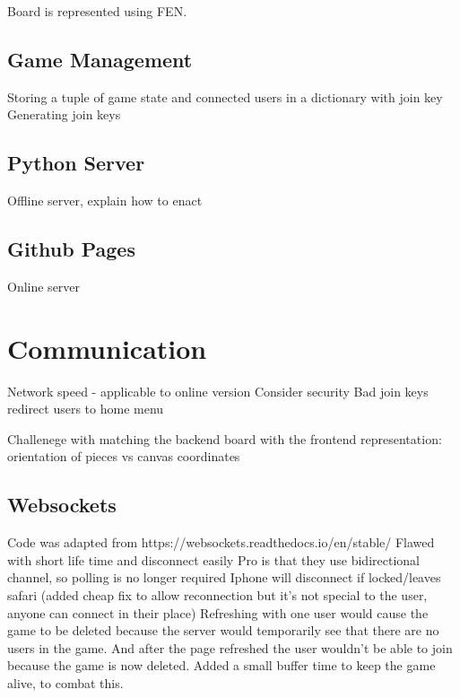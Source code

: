 Board is represented using FEN.

\subsection{Game Management}

Storing a tuple of game state and connected users in a dictionary with join key\linebreak
Generating join keys

\subsection{Python Server}

Offline server, explain how to enact

\subsection{Github Pages}

Online server

\section{Communication}

Network speed - applicable to online version\linebreak
Consider security\linebreak
Bad join keys redirect users to home menu

Challenege with matching the backend board with the frontend representation: orientation of pieces vs canvas coordinates

\subsection{Websockets}
Code was adapted from https://websockets.readthedocs.io/en/stable/\linebreak
Flawed with short life time and disconnect easily\linebreak
Pro is that they use bidirectional channel, so polling is no longer required\linebreak
Iphone will disconnect if locked/leaves safari (added cheap fix to allow reconnection but it's not special to the user, anyone can connect in their place)\linebreak
Refreshing with one user would cause the game to be deleted because the server would temporarily see that there are no users in the game. And after the page refreshed the user wouldn't be able to join because the game is now deleted. Added a small buffer time to keep the game alive, to combat this.\linebreak

